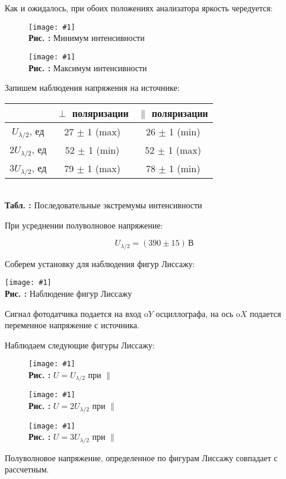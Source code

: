 \documentclass{beamer}
\newcounter{picture}
\newcounter{tbl}
\newcommand{\embed}[3]{\begin{center}
		\texttt{[image: \#1]}
		\\\textbf{Рис. \thepicture:} #3
		\label{pic_\thepicture}
		\addtocounter{picture}{1}
\end{center}}
\newcommand{\embedtbl}[3]{\begin{center}
		\begin{tabular}{#1}
			#2
		\end{tabular}
		\\\textbf{Табл. \thetbl:} #3
		\label{tbl_\thetbl}
		\addtocounter{tbl}{1}
\end{center}}
\begin{document}
	\begin{frame}
		Как и ожидалось, при обоих положениях анализатора яркость чередуется:
		
		\begin{figure}[h]
			\begin{minipage}{0.45\linewidth}
				\embed{PIC_6.png}{0.06}{Минимум интенсивности}
			\end{minipage}
			\begin{minipage}{0.45\linewidth}
				\embed{PIC_7.png}{0.06}{Максимум интенсивности}
			\end{minipage}
		\end{figure}
		
		Запишем наблюдения напряжения на источнике:
		
		{\footnotesize \embedtbl{|c|c|c|}{
			\hline
			& $\perp$ поляризации & $\parallel$ поляризации
			\\\hline
			$U_{\lambda/2}$, ед & 27 $\pm$ 1 (max) & 26 $\pm$ 1 (min)
			\\\hline
			$2U_{\lambda/2}$, ед & 52 $\pm$ 1 (min) & 52 $\pm$ 1 (max)
			\\\hline
			$3U_{\lambda/2}$, ед & 79 $\pm$ 1 (max) & 78 $\pm$ 1 (min)
			\\\hline
			
		}{Последовательные экстремумы интенсивности}}
		
		При усреднении полуволновое напряжение:
		
			$$ U_{\lambda/2} = (390 \pm 15)\,\text{В} $$ 
	\end{frame}

	\begin{frame}
		Соберем установку для наблюдения фигур Лиссажу:

		\embed{PIC_1.png}{0.1}{Наблюдение фигур Лиссажу}
		
		Сигнал фотодатчика подается на вход $\mathrm{o}Y$ осциллографа, на ось $\mathrm{o}X$ подается переменное напряжение с источника.
	\end{frame}

	\begin{frame}
		Наблюдаем следующие фигуры Лиссажу:
		
		\begin{figure}[h]
			\begin{minipage}{0.45\linewidth}
				\embed{PIC_8.png}{0.045}{$U = U_{\lambda/2}$ при $\parallel$}
			\end{minipage}
			\begin{minipage}{0.45\linewidth}
				\embed{PIC_9.png}{0.031}{$U = 2U_{\lambda/2}$ при $\parallel$}
			\end{minipage}
			\begin{minipage}{0.45\linewidth}
				\embed{PIC_10.png}{0.045}{$U = 3U_{\lambda/2}$ при $\parallel$}
			\end{minipage}
		\end{figure}
	
		Полуволновое напряжение, определенное по фигурам Лиссажу совпадает с рассчетным.
	\end{frame}
\end{document}
